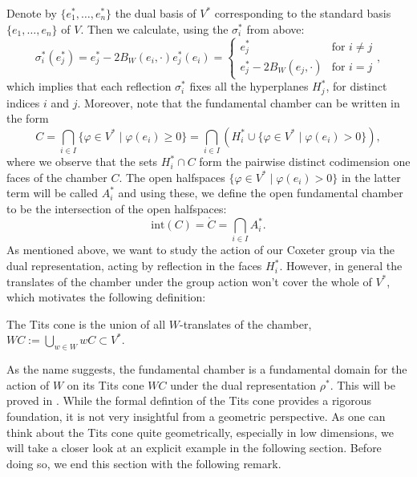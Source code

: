 Denote by \(\{e_1^*,\ldots, e_n^*\}\) the dual basis of \(V^*\) corresponding to the standard basis \(\{e_1,\ldots, e_n\}\) of \(V\).
Then we calculate, using the \(\sigma_i^*\) from above:
\begin{equation*}
    \sigma_i^*(e_j^*) = e_j^* - 2B_W(e_i,\cdot)e_j^*(e_i) =
    \begin{cases}
        e_j^*                   & \text{for } i\neq j \\
        e_j^* - 2B_W(e_j,\cdot) & \text{for } i=j
    \end{cases},
\end{equation*}
which implies that each reflection \(\sigma_i^*\) fixes all the hyperplanes \(H_j^*\), for distinct indices \(i\) and \(j\).
Moreover, note that the fundamental chamber can be written in the form %
\[C = \bigcap_{i\in I}\{\varphi\in V^*\;\vert\; \varphi(e_i)\geq 0\} = \bigcap_{i\in I} (H_i^* \cup \{\varphi\in V^*\;\vert\; \varphi(e_i)> 0\}),\]
where we observe that the sets \(H_i^*\cap C\) form the pairwise distinct codimension one faces of the chamber \(C\).
The open halfspaces \(\{\varphi \in V^* \;\vert\; \varphi(e_i) > 0\}\) in the latter term will be called \(A_i^*\) and using these, we define the open fundamental chamber to be the intersection of the open halfspaces:
\[\text{int}(C) = \mathring{C} = \bigcap_{i \in I} A_i^*.\] %
As mentioned above, we want to study the action of our Coxeter group via the dual representation, acting by reflection in the faces \(H_i^*\).
However, in general the translates of the chamber under the group action won't cover the whole of \(V^*\), which motivates the following definition:

\begin{definition}
    The Tits cone is the union of all \(W\)-translates of the chamber, \(WC := \underset{w \in W}{\bigcup} wC \subset V^*\).
\end{definition}

As the name suggests, the fundamental chamber is a fundamental domain for the action of \(W\) on its Tits cone \(WC\) under the dual representation \(\rho^*\).
This will be proved in .
While the formal defintion of the Tits cone provides a rigorous foundation, it is not very insightful from a geometric perspective.
As one can think about the Tits cone quite geometrically, especially in low dimensions, we will take a closer look at an explicit example in the following section.
Before doing so, we end this section with the following remark.

